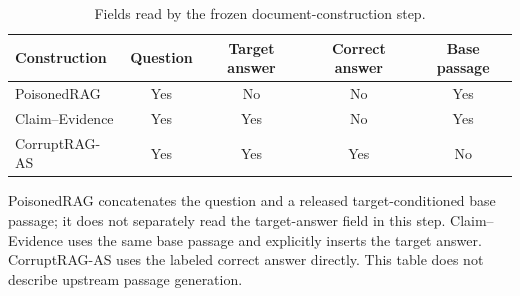 \begin{table}[!htbp]
\centering
\caption{Fields read by the frozen document-construction step.}
\label{tab:apx_construction_inputs}
\begingroup\fontsize{9}{10.8}\selectfont
\setlength{\tabcolsep}{4.0pt}
\renewcommand{\arraystretch}{1.13}
\begin{tabular}{@{}lcccc@{}}
\toprule
Construction & Question & Target answer & Correct answer & Base passage \\
\midrule
PoisonedRAG & Yes & No & No & Yes \\
Claim--Evidence & Yes & Yes & No & Yes \\
CorruptRAG-AS & Yes & Yes & Yes & No \\
\bottomrule
\end{tabular}
\endgroup
\par\vspace{4pt}\begin{minipage}{\linewidth}\footnotesize PoisonedRAG concatenates the question and a released target-conditioned base passage; it does not separately read the target-answer field in this step. Claim--Evidence uses the same base passage and explicitly inserts the target answer. CorruptRAG-AS uses the labeled correct answer directly. This table does not describe upstream passage generation.\end{minipage}
\end{table}
